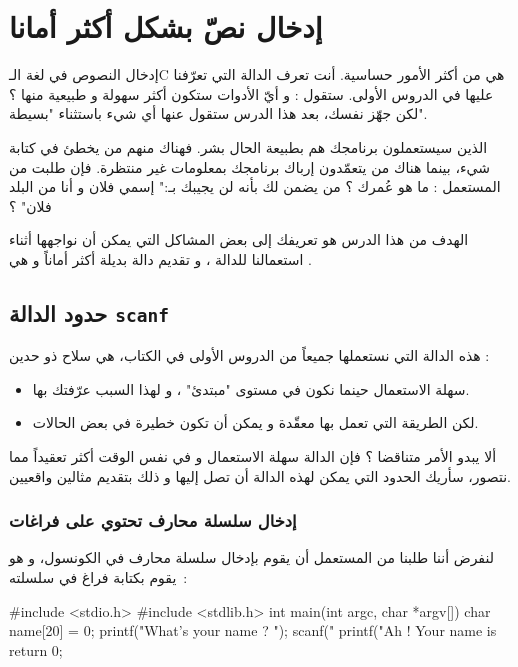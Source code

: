 \chapter{إدخال نصّ بشكل أكثر أمانا}

إدخال النصوص في لغة الـ\textenglish{C}
هي من أكثر الأمور حساسية. أنت تعرف الدالة
التي تعرّفنا عليها في الدروس الأولى. ستقول : و أيّ الأدوات ستكون أكثر سهولة و طبيعية منها ؟ لكن جهّز نفسك، بعد هذا الدرس ستقول عنها أي شيء باستثناء "بسيطة".

الذين سيستعملون برنامجك هم بطبيعة الحال بشر. فهناك منهم من يخطئ في كتابة شيء، بينما هناك من يتعمّدون إرباك برنامجك بمعلومات غير منتظرة. فإن طلبت من المستعمل : ما هو عُمرك ؟ من يضمن لك بأنه لن يجيبك بـ:" إسمي فلان و أنا من البلد فلان" ؟

الهدف من هذا الدرس هو تعريفك إلى بعض المشاكل التي يمكن أن نواجهها أثناء استعمالنا للدالة
،
و تقديم دالة بديلة أكثر أماناً و هي
.

\section{حدود الدالة \texttt{scanf}}

هذه الدالة التي نستعملها جميعاً من الدروس الأولى في الكتاب، هي سلاح ذو حدين :

\begin{itemize}
  \item سهلة الاستعمال حينما نكون في مستوى "مبتدئ" ، و لهذا السبب عرّفتك بها.
  \item لكن الطريقة التي تعمل بها معقّدة و يمكن أن تكون خطيرة في بعض الحالات.
\end{itemize}

ألا يبدو الأمر متناقضا ؟ فإن الدالة
سهلة الاستعمال و في نفس الوقت أكثر تعقيداً مما نتصور، سأريك الحدود التي يمكن لهذه الدالة أن تصل إليها و ذلك بتقديم مثالين واقعيين.

\subsection{إدخال سلسلة محارف تحتوي على فراغات }

لنفرض أننا طلبنا من المستعمل أن يقوم بإدخال سلسلة محارف في الكونسول، و هو يقوم بكتابة فراغ في سلسلته~:

\begin{Csource}
  #include <stdio.h>
  #include <stdlib.h>
  int main(int argc, char *argv[])
  {
  	char name[20] = {0};
  	printf("What's your name ? ");
  	scanf("%
  	printf("Ah ! Your name is %
  	return 0;
  }
\end{Csource}

